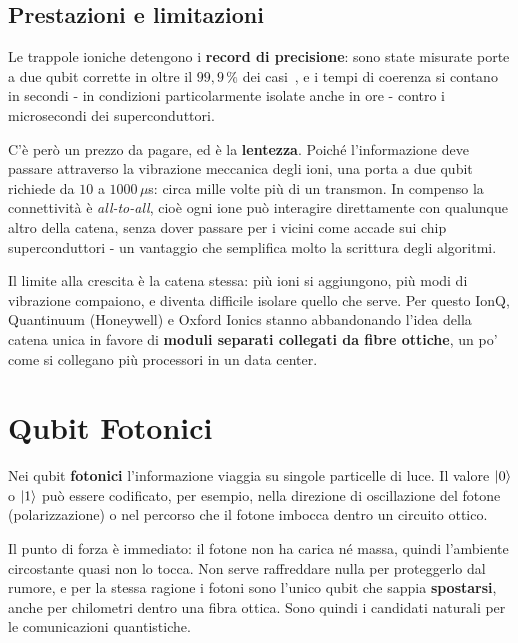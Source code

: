\subsection{Prestazioni e limitazioni}
\label{subsec:trap-presta}

Le trappole ioniche detengono i \textbf{record di precisione}: sono state
misurate porte a due qubit corrette in oltre il $99{,}9\,\%$ dei
casi~\cite{ballance2016highfidelity}, e i tempi di coerenza si contano in
secondi - in condizioni particolarmente isolate anche in ore - contro i
microsecondi dei superconduttori.

C'è però un prezzo da pagare, ed è la \textbf{lentezza}. Poiché l'informazione
deve passare attraverso la vibrazione meccanica degli ioni, una porta a due
qubit richiede da $10$ a $1000\,\mu$s: circa mille volte più di un transmon.
In compenso la connettività è \textit{all-to-all}, cioè ogni ione può
interagire direttamente con qualunque altro della catena, senza dover passare
per i vicini come accade sui chip superconduttori - un vantaggio che
semplifica molto la scrittura degli algoritmi.

Il limite alla crescita è la catena stessa: più ioni si aggiungono, più modi di
vibrazione compaiono, e diventa difficile isolare quello che serve. Per questo
IonQ, Quantinuum (Honeywell) e Oxford Ionics stanno abbandonando l'idea della
catena unica in favore di \textbf{moduli separati collegati da fibre ottiche},
un po' come si collegano più processori in un data center.

\section{Qubit Fotonici}
\label{sec:fotonici}

Nei qubit \textbf{fotonici} l'informazione viaggia su singole particelle di
luce. Il valore $\ket{0}$ o $\ket{1}$ può essere codificato, per esempio, nella
direzione di oscillazione del fotone (polarizzazione) o nel percorso che il
fotone imbocca dentro un circuito ottico.

Il punto di forza è immediato: il fotone non ha carica né massa, quindi
l'ambiente circostante quasi non lo tocca. Non serve raffreddare nulla per
proteggerlo dal rumore, e per la stessa ragione i fotoni sono l'unico qubit che
sappia \textbf{spostarsi}, anche per chilometri dentro una fibra ottica. Sono
quindi i candidati naturali per le comunicazioni quantistiche.

